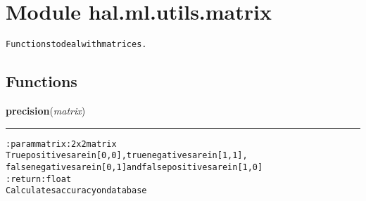 %
%
%


\section{Module hal.ml.utils.matrix}

    \label{hal:ml:utils:matrix}
\begin{alltt}
Functions to deal with matrices. 
\end{alltt}



  \subsection{Functions}

    \label{hal:ml:utils:matrix:precision}

    \vspace{0.5ex}

\hspace{.8\funcindent}\begin{boxedminipage}{\funcwidth}

    \raggedright \textbf{precision}(\textit{matrix})

    \vspace{-1.5ex}

    \rule{\textwidth}{0.5\fboxrule}
\setlength{\parskip}{2ex}
\begin{alltt}

:param matrix: 2 x 2 matrix
    True positives are in [0,0], true negatives are in [1,1],
    false negatives are in [0,1] and false positives are in [1,0]
:return: float
    Calculates accuracy on database
\end{alltt}

\setlength{\parskip}{1ex}
    \end{boxedminipage}

